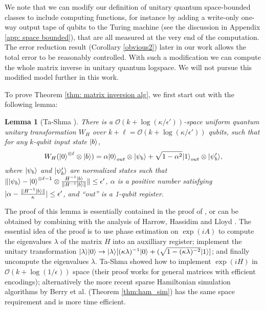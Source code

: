 \documentclass[11pt]{article}
\newtheorem{lemma}[theorem]{Lemma}
\theoremstyle{definition}
\theoremstyle{remark}
\newcommand\bigoh{\mathcal{O}}
\newcommand{\wf}[1]{{\color{violet}{[{\bf wf:}#1]}}}
\begin{document}
We note that we can modify our definition of unitary quantum space-bounded classes to include computing functions, for instance by adding a write-only one-way output tape of qubits to the Turing machine (see the discussion in Appendix \ref{app: space bounded}), that are all measured at the very end of the computation. The error reduction result (Corollary \ref{obvious2}) later in our work allows the total error to be reasonably controlled. With such a modification we can compute the whole matrix inverse in unitary quantum logspace. We will not pursue this modified model further in this work.

To prove Theorem \ref{thm: matrix inversion alg}, we first start out with the following lemma:
\begin{lemma}[Ta-Shma \cite{tashma}] \label{lem: matrix inversion lemma}
There is a $\bigoh (k + \log(\kappa/\epsilon'))$-space uniform quantum unitary transformation $W_H$ over $k+\ell = \bigoh (k+ \log(\kappa/\epsilon'))$ qubits, such that for any $k$-qubit input state ${\left\vert{b}\right\rangle}$,
\begin{equation}
W_H ({\left\vert{0}\right\rangle}^{\otimes \ell} \otimes {\left\vert{b}\right\rangle}) = \alpha {\left\vert{0}\right\rangle}_{out} \otimes {\left\vert{\psi_b}\right\rangle} + \sqrt{1-\alpha^2} {\left\vert{1}\right\rangle}_{out} \otimes{\left\vert{\psi'_b}\right\rangle},
\end{equation}
where ${\left\vert{\psi_b}\right\rangle}$ and ${\left\vert{\psi'_b}\right\rangle}$ are normalized states such that $\| {\left\vert{\psi_b}\right\rangle} - {\left\vert{0}\right\rangle}^{\otimes \ell-1} \otimes \frac{H^{-1}{\left\vert{b}\right\rangle}} {\|H^{-1}{\left\vert{b}\right\rangle}\|} \| \le \epsilon'$, $\alpha$ is a positive number satisfying $|\alpha - \frac{\|H^{-1}{\left\vert{b}\right\rangle}\|}{\kappa}| \le \epsilon'$, and ``out'' is a 1-qubit register.
\end{lemma}
The proof of this lemma is essentially contained in the proof of \cite[Theorem~6.3]{tashma}, or can be obtained by combining \cite[Theorem~4.1]{tashma} with the analysis of Harrow, Hassidim and Lloyd \cite{HHL}. The essential idea of the proof is to use phase estimation on $\exp(iA)$ to compute the eigenvalues $\lambda$ of the matrix $H$ into an auxilliary register; implement the unitary transformation ${\left\vert{\lambda}\right\rangle}{\left\vert{0}\right\rangle} \rightarrow {\left\vert{\lambda}\right\rangle}[(\kappa\lambda)^{-1}{\left\vert{0}\right\rangle}+(\sqrt{1-(\kappa\lambda)^{-2}}{\left\vert{1}\right\rangle}]$; and finally uncompute the eigenvalues $\lambda$. Ta-Shma showed how to implement $\exp(iH)$ in $\bigoh (k+\log(1/\epsilon))$ space \cite[Theorem~4.1]{tashma} (their proof works for general matrices with efficient encodings); alternatively the more recent sparse Hamiltonian simulation algorithms by Berry et al. (Theorem \ref{thm:ham_sim}) has the same space requirement and is more time efficient.
\end{document}
